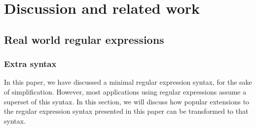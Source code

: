 \chapter{Discussion and related work}
\label{discussion}

\section{Real world regular expressions}


\subsection{Extra syntax}

In this paper, we have discussed a minimal regular expression syntax, for the
sake of simplification. However, most applications using regular expressions
assume a superset of this syntax. In this section, we will discuss how popular
extensions to the regular expression syntax presented in this paper can be
transformed to that syntax.

